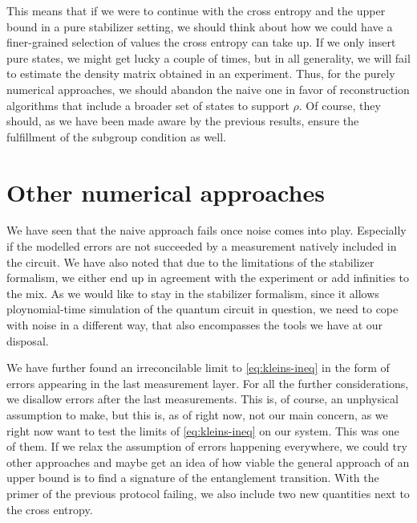 This means that if we were to continue with the cross entropy and the upper
bound in a pure stabilizer setting, we should think about how we could have a
finer-grained selection of values the cross entropy can take up. If we only
insert pure states, we might get lucky a couple of times, but in all
generality, we will fail to estimate the density matrix obtained in an
experiment. Thus, for the purely numerical approaches, we should abandon the
naive one in favor of reconstruction algorithms that include a broader set of
states to support $\rho$. Of course, they should, as we have been made aware by
the previous results, ensure the fulfillment of the subgroup condition as well. 

\clearpage
\section{Other numerical approaches}\label{sec:upperbound-numerics}

We have seen that the naive approach fails once noise comes into play.
Especially if the modelled errors are not succeeded by a measurement natively
included in the circuit. We have also noted that due to the limitations of the
stabilizer formalism, we either end up in agreement with the experiment or add
infinities to the mix. As we would like to stay in the stabilizer formalism,
since it allows ploynomial-time simulation of the quantum circuit in question,
we need to cope with noise in a different way, that also encompasses the tools
we have at our disposal. 

We have further found an irreconcilable limit to \cref{eq:kleins-ineq} in the
form of errors appearing in the last measurement layer. For all the further
considerations, we disallow errors after the last measurements. This is, of
course, an unphysical assumption to make, but this is, as of right now, not our
main concern, as we right now want to test the limits of \cref{eq:kleins-ineq}
on our system. This was one of them. If we relax the assumption of errors
happening everywhere, we could try other approaches and maybe get an idea of
how viable the general approach of an upper bound is to find a signature of the
entanglement transition.  With the primer of the previous protocol failing, we
also include two new quantities next to the cross entropy. 

